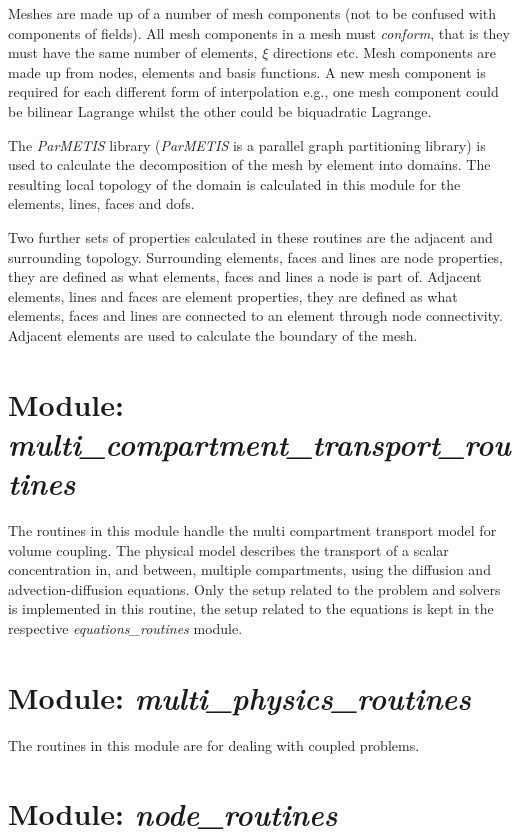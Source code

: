 Meshes are made up of a number of mesh components (not to be confused with 
components of fields). All mesh components in a mesh must \emph{conform}, that 
is they must have the same number of elements, $\xi$ directions etc. Mesh 
components are made up from nodes, elements and basis functions. A new mesh 
component is required for each different form of interpolation e.g., one mesh 
component could be bilinear Lagrange whilst the other could be biquadratic 
Lagrange.

The \emph{ParMETIS} library (\emph{ParMETIS} is a parallel graph partitioning 
library) is used to calculate the decomposition of the mesh by element into 
domains. The resulting local topology of the domain is calculated in this 
module for the elements, lines, faces and dofs.

Two further sets of properties calculated in these routines are the adjacent 
and surrounding topology. Surrounding elements, faces and lines are node 
properties, they are defined as what elements, faces and lines a node is part 
of. Adjacent elements, lines and faces are element properties, they are defined 
as what elements, faces and lines are connected to an element through node 
connectivity. Adjacent elements are used to calculate the boundary of the mesh.


\section{Module: \\ \emph{multi\_compartment\_transport\_routines}}
\label{sec:multicompartmenttransportroutines}

The routines in this module handle the multi compartment transport model for 
volume coupling. The physical model describes the transport of a scalar 
concentration in, and between, multiple compartments, using the diffusion 
and advection-diffusion equations. Only the setup related to the problem and 
solvers is implemented in this routine, the setup related to the equations 
is kept in the respective \emph{equations\_routines} module. 


\section{Module: \emph{multi\_physics\_routines}}
\label{sec:multiphysicsroutines}

The routines in this module are for dealing with coupled problems.


\section{Module: \emph{node\_routines}}
\label{sec:noderoutines}

